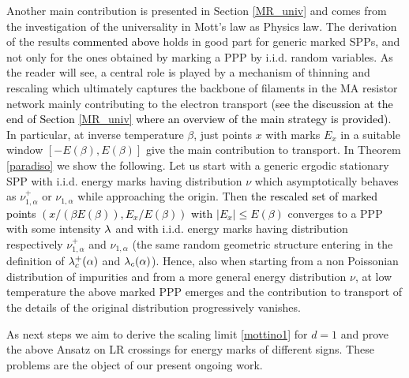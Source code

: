 \documentclass[12pt,a4paper,reqno]{amsart}
\let\a=\alpha \let\b=\beta   \let\d=\delta  \let\e=\varepsilon
\newcommand{\rosso}{\textcolor{black}} %
\begin{document}
\smallskip

Another main contribution  is presented in Section \ref{MR_univ} and comes from  the investigation of the universality in Mott's law as Physics law.  The derivation of the results   \rosso{commented above} holds in good part for generic marked SPPs, and not only for the ones obtained by marking a PPP by i.i.d. random variables. As the reader will see,  a central role is played by a  mechanism of thinning and rescaling which ultimately  captures the backbone of  filaments in the MA resistor network mainly contributing to the electron transport \rosso{(see the discussion at the end of  Section \ref{MR_univ} where an overview of the main strategy is provided)}. In particular, at inverse temperature $\b$, just  points $x$  with marks  $E_x$ in a suitable window $[ -E(\b), E(\b)]$ give the main contribution to transport.
In Theorem \ref{paradiso} we  show the following. Let us  start with a generic 
ergodic stationary SPP with i.i.d. energy marks having distribution $\nu$  which asymptotically behaves as $\nu^+_{1,\a}$ or $\nu_{1,\a}$ while approaching  the origin. Then \rosso{the rescaled set of marked points $\left( x/(\b E(\b)), E_x /E(\b)\right)$  with $|E_x|\leq  E(\b)$} 
converges to a  PPP with some intensity  $\lambda$ and with  i.i.d. energy marks 
having distribution respectively  $\nu^+_{1,\a}$ and $\nu_{1,\a}$ (the same random geometric structure entering in the definition of $\l_c^+(\a)$ and $\l_c(\a)$).
Hence, also when starting from a  non Poissonian  distribution of impurities and from a more general energy distribution $\nu$, at low temperature   the above marked  PPP  emerges and the contribution to transport of the  details of the original distribution progressively  vanishes.


\smallskip


As next steps we aim to derive the scaling limit  \eqref{mottino1} for $d=1$ and prove  the above Ansatz on LR crossings for energy marks of different signs. These problems are the object  of our present ongoing work.



\smallskip
\end{document}

